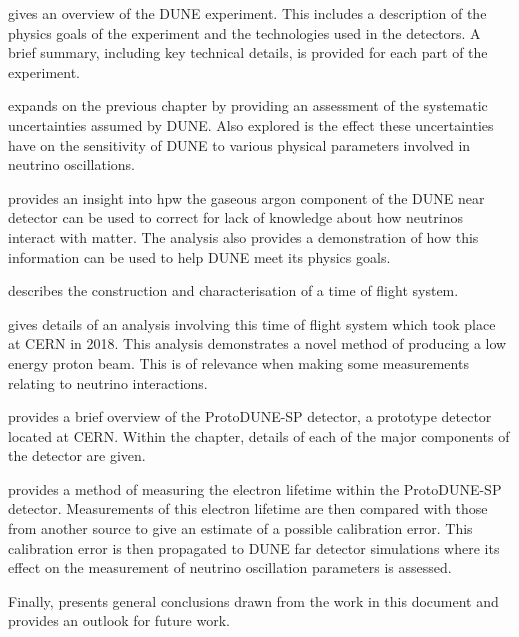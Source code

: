  gives an overview of the DUNE experiment. 
This includes a description of the physics goals of the experiment and the technologies used in the detectors. 
A brief summary, including key technical details, is provided for each part of the experiment.

 expands on the previous chapter by providing an assessment of the systematic uncertainties assumed by DUNE.
Also explored is the effect these uncertainties have on the sensitivity of DUNE to various physical parameters involved in neutrino oscillations.

 provides an insight into hpw the gaseous argon component of the DUNE near detector can be used to correct for lack of knowledge about how neutrinos interact with matter.
The analysis also provides a demonstration of how this information can be used to help DUNE meet its physics goals.

 describes the construction and characterisation of a time of flight system. 

 gives details of an analysis involving this time of flight system which took place at CERN in 2018.
This analysis demonstrates a novel method of producing a low energy proton beam.
This is of relevance when making some measurements relating to neutrino interactions.

 provides a brief overview of the ProtoDUNE-SP detector, a prototype detector located at CERN.
Within the chapter, details of each of the major components of the detector are given.

 provides a method of measuring the electron lifetime within the ProtoDUNE-SP detector.
Measurements of this electron lifetime are then compared with those from another source to give an estimate of a possible calibration error.
This calibration error is then propagated to DUNE far detector simulations where its effect on the measurement of neutrino oscillation parameters is assessed.

Finally,  presents general conclusions drawn from the work in this document and provides an outlook for future work.